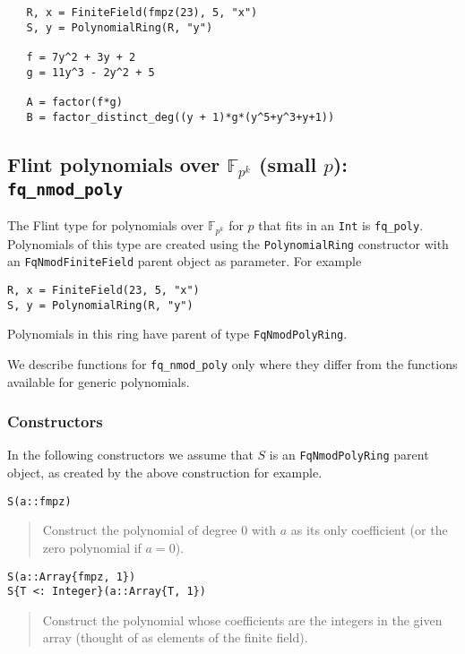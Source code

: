 \documentclass[a4paper,10pt]{article}
\newcommand{\F}{\mathbb{F}}
\newcommand{\code}{\lstinline}
\newcommand{\desc}[1]{\vspace{-3mm}\begin{quote}#1\end{quote}}
\begin{document}
{{\begin{lstlisting}
   R, x = FiniteField(fmpz(23), 5, "x")
   S, y = PolynomialRing(R, "y")

   f = 7y^2 + 3y + 2
   g = 11y^3 - 2y^2 + 5

   A = factor(f*g)
   B = factor_distinct_deg((y + 1)*g*(y^5+y^3+y+1))
\end{lstlisting}

\subsection{Flint polynomials over $\F_{p^k}$ (small $p$): \code{fq_nmod_poly}}

The Flint type for polynomials over $\F_{p^k}$ for $p$ that fits in an \code{Int} is
\code{fq_poly}. Polynomials of this type are created using the \code{PolynomialRing}
constructor with an \code{FqNmodFiniteField} parent object as parameter. For example

\begin{lstlisting}
R, x = FiniteField(23, 5, "x")
S, y = PolynomialRing(R, "y")
\end{lstlisting}

Polynomials in this ring have parent of type \code{FqNmodPolyRing}.

We describe functions for \code{fq_nmod_poly} only where they differ from the functions
available for generic polynomials.

\subsubsection{Constructors}

In the following constructors we assume that $S$ is an \code{FqNmodPolyRing} parent 
object, as created by the above construction for example.

\begin{lstlisting}
S(a::fmpz)
\end{lstlisting}

\desc{Construct the polynomial of degree $0$ with $a$ as its only coefficient (or
the zero polynomial if $a = 0$).}

\begin{lstlisting}
S(a::Array{fmpz, 1})
S{T <: Integer}(a::Array{T, 1})
\end{lstlisting}

\desc{Construct the polynomial whose coefficients are the integers in the given
array (thought of as elements of the finite field).}

}}
\end{document}
